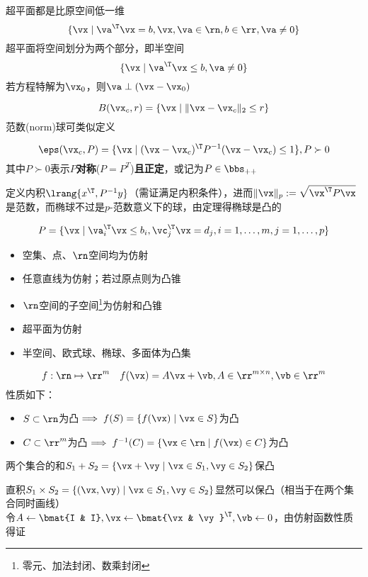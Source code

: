 \begin{definition}
超平面都是比原空间低一维
\[\{\vx\mid \va^\T\vx=b,\vx,\va\in\rn,b\in\rr,\va\ne 0\}\]
超平面将空间划分为两个部分，即半空间
\[\{\vx\mid \va^\T\vx\leq b,\va\ne 0\}\]
若方程特解为$\vx_0$，则$\va\perp(\vx-\vx_0)$
\end{definition}
\begin{definition}
\[B(\vx_c,r)=\{\vx\mid\|\vx-\vx_c\|_2\leq r\}\]
范数(norm)球可类似定义
\end{definition}
\begin{definition}[椭球(ellipsoid)]
\[\eps(\vx_c,P)=\{\vx\mid(\vx-\vx_c)^\T P^{-1}(\vx-\vx_c)\leq 1\},P\succ 0\]
其中$P\succ 0$表示$P$\textbf{对称}($P=P^T$)\textbf{且正定}，或记为$P\in\bbs_{++}$
\end{definition}
\begin{analysis}
定义内积$\lrang{x^\T, P^{-1}y}$（需证满足内积条件），进而$\|\vx\|_p:=\sqrt{\vx^\T P\vx}$是范数，而椭球不过是$p$-范数意义下的球，由定理得椭球是凸的
\end{analysis}
\begin{definition}
\[P=\{\vx\mid\va_i^\T\vx\leq b_i,\vc_j^\T\vx=d_j,i=1,\ldots,m,j=1,\ldots,p\}\]
\end{definition}
\begin{example}
\begin{itemize}
	\item 空集、点、$\rn$空间均为仿射
	\item 任意直线为仿射；若过原点则为凸锥
	\item $\rn$空间的子空间\footnote{零元、加法封闭、数乘封闭}为仿射和凸锥
	\item 超平面为仿射
	\item 半空间、欧式球、椭球、多面体为凸集
\end{itemize}
\end{example}

\begin{definition}[仿射函数]
\[f:\rn\mapsto\rr^m\quad f(\vx)=A\vx+\vb,A\in\rr^{m\times n},\vb\in\rr^m\]
性质如下：
\begin{itemize}
	\item $S\subset\rn$为凸$\implies f(S)=\{f(\vx)\mid\vx\in S\}$为凸
	\item $C\subset\rr^m$为凸$\implies f^{-1}(C)=\{\vx\in\rn\mid f(\vx)\in C\}$为凸
\end{itemize}
\end{definition}
\begin{example}
两个集合的和$S_1+S_2=\{\vx+\vy\mid \vx\in S_1,\vy\in S_2\}$保凸
\end{example}
\begin{analysis}
直积$S_1\times S_2=\{(\vx,\vy)\mid \vx\in S_1,\vy\in S_2\}$显然可以保凸（相当于在两个集合同时画线）\\
令$A\gets\bmat{I & I},\vx\gets\bmat{\vx & \vy}^\T,\vb\gets 0$，由仿射函数性质得证
\end{analysis}


